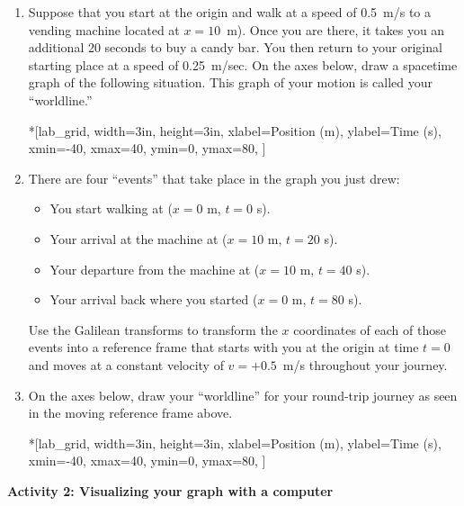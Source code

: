 \begin{enumerate}[labparts]

\item Suppose that you start at the origin and walk at a speed of 0.5~m/s to a vending machine located at $x=10$~m).  Once you are there, it takes you an additional 20 seconds to buy a candy bar.  You then return to your original starting place at a speed of 0.25~m/sec. On the axes below, draw a spacetime graph of the following situation.  This graph of your motion is called your ``worldline.''

\begin{lab_axis}*[lab_grid,
	width=3in, height=3in,
	xlabel={Position (m)},
	ylabel={Time (s)},
	xmin=-40, xmax=40,
	ymin=0, ymax=80,
	]
\end{lab_axis}

\pagebreak[2]
\item There are four ``events'' that take place in the graph you just drew:
\begin{itemize}[nosep]
\item You start walking at ($x=0$ m, $t=0$ s).
\item Your arrival at the machine at ($x=10$ m, $t=20$ s).
\item Your departure from the machine at ($x=10$ m, $t=40$ s).
\item Your arrival back where you started ($x=0$ m, $t=80$ s).
\end{itemize}
Use the Galilean transforms to transform the $x$ coordinates of each of those events into a reference frame that starts with you at the origin at time $t=0$ and moves at a constant velocity of $v=+0.5$~m/s throughout your journey.
\answerspace{1in}

\item On the axes below, draw your ``worldline'' for your round-trip journey as seen in the moving reference frame above.

\begin{lab_axis}*[lab_grid,
	width=3in, height=3in,
	xlabel={Position (m)},
	ylabel={Time (s)},
	xmin=-40, xmax=40,
	ymin=0, ymax=80,
	]
\end{lab_axis}

\end{enumerate}

\textbf{Activity 2: Visualizing your graph with a computer} 

